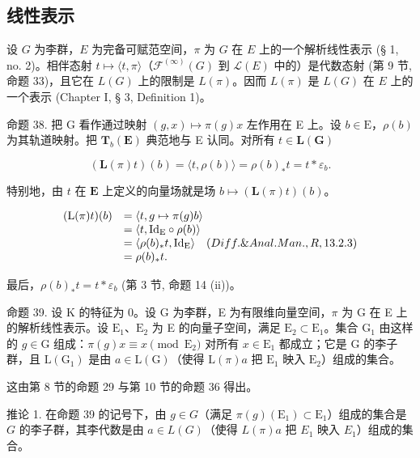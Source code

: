 \subsection{线性表示}

设 \(G\) 为李群，\(E\) 为完备可赋范空间，\(\pi\) 为 \(G\) 在 \(E\) 上的一个解析线性表示 (§ 1, no. 2)。相伴态射 \(t \mapsto \langle t, \pi \rangle\)（\(\mathcal{F}^{(\infty)}(G)\) 到 \(\mathcal{L}(E)\) 中的）是代数态射 (第 9 节, 命题 33)，且它在 \(L(G)\) 上的限制是 \(L(\pi)\)。因而 \(L(\pi)\) 是 \(L(G)\) 在 \(E\) 上的一个表示 (Chapter I, § 3, Definition 1)。

命题 38. 把 G 看作通过映射 \((g,x)\mapsto \pi (g)x\) 左作用在 E 上。设 \(b\in \mathrm{E}\)，\(\rho (b)\) 为其轨道映射。把 \(\mathbf{T}_b(\mathbf{E})\) 典范地与 E 认同。对所有 \(t\in \mathbf{L}(\mathbf{G})\)

\[
(\mathbf {L} (\pi) t) (b) = \langle t, \rho (b) \rangle = \rho (b) _ {*} t = t * \varepsilon_ {b}.
\]

特别地，由 \(t\) 在 \(\mathbf{E}\) 上定义的向量场就是场 \(b \mapsto (\mathbf{L}(\pi)t)(b)\)。

\[
\begin{array}{r l} (\mathrm{L} (\pi) t) (b) & = \langle t, g \mapsto \pi (g) b \rangle \\ & = \langle t, \mathrm{Id} _ {\mathrm{E}} \circ \rho (b) \rangle \\ & = \langle \rho (b) _ {*} t, \mathrm{Id} _ {\mathrm{E}} \rangle \quad (Diff. \& Anal. Man., R, 13.2.3) \\ & = \rho (b) _ {*} t. \end{array}
\]

最后，\(\rho(b)_{*}t = t*\varepsilon_{b}\) (第 3 节, 命题 14 (ii))。

命题 39. 设 K 的特征为 0。设 G 为李群，E 为有限维向量空间，\(\pi\) 为 G 在 E 上的解析线性表示。设 \(\mathrm{E}_1\)、\(\mathrm{E}_2\) 为 E 的向量子空间，满足 \(\mathrm{E}_2 \subset \mathrm{E}_1\)。集合 \(\mathrm{G}_1\) 由这样的 \(g \in \mathrm{G}\) 组成：\(\pi(g) x \equiv x \pmod{\mathrm{E}_2}\) 对所有 \(x \in \mathrm{E}_1\) 都成立；它是 G 的李子群，且 \(\mathrm{L}(\mathrm{G}_1)\) 是由 \(a \in \mathrm{L}(\mathrm{G})\)（使得 \(\mathrm{L}(\pi)a\) 把 \(\mathrm{E}_1\) 映入 \(\mathrm{E}_2\)）组成的集合。

这由第 8 节的命题 29 与第 10 节的命题 36 得出。

推论 1. 在命题 39 的记号下，由 \(g \in G\)（满足 \(\pi(g)(\mathrm{E}_1) \subset \mathrm{E}_1\)）组成的集合是 \(G\) 的李子群，其李代数是由 \(a \in L(G)\)（使得 \(L(\pi)a\) 把 \(E_1\) 映入 \(E_1\)）组成的集合。


